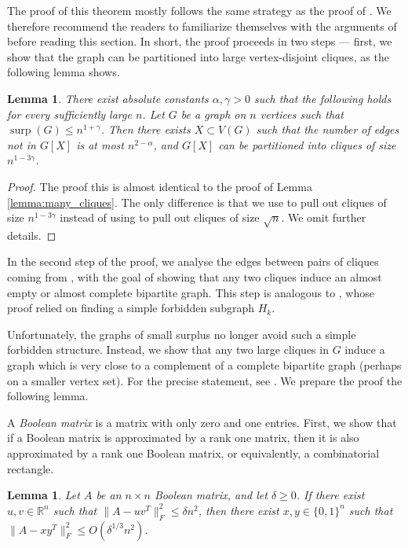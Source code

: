 \documentclass[11pt]{article}
\theoremstyle{plain}
\newtheorem{lemma}[theorem]{Lemma}
\theoremstyle{definition}
\DeclareMathOperator{\surp}{surp}
\begin{document}
The proof of this theorem mostly follows the same strategy as the proof of . We therefore recommend the readers to familiarize themselves with the arguments of  before reading this section. 
In short, the proof proceeds in two steps --- first, we show that the graph can be partitioned into large vertex-disjoint cliques, as the following lemma shows.

\begin{lemma}\label{lemma:many_cliques_MaxCut}
    There exist absolute constants $\alpha, \gamma>0$ such that the following holds for every sufficiently large $n$. 
    Let $G$ be a graph on $n$ vertices such that $\surp(G)\leq n^{1+\gamma}$. Then there exists $X\subset V(G)$ such that the number of edges not in $G[X]$ is at most $n^{2-\alpha}$, and $G[X]$ can be partitioned into cliques of size $n^{1-3\gamma}$. 
\end{lemma}

\begin{proof}
    The proof this is almost identical to the proof of Lemma \ref{lemma:many_cliques}. 
    The only difference is that we use  to pull out cliques of size $n^{1-3\gamma}$ instead of using  to pull out cliques of size $\sqrt{n}$. 
    We omit further details.
\end{proof}

In the second step of the proof, we analyse the edges between pairs of cliques coming from , with the goal of showing that any two cliques induce an almost empty or almost complete bipartite graph. 
This step is analogous to , whose proof relied on finding a simple forbidden subgraph $H_k$. 

Unfortunately, the graphs of small surplus no longer avoid such a simple forbidden structure. Instead, we show that any two large cliques in $G$ induce a graph which is very close to a complement of a complete bipartite graph (perhaps on a smaller vertex set). For the precise statement, see . 
We prepare the proof the following lemma.

A \emph{Boolean matrix} is a matrix with only zero and one entries. First, we show that if a Boolean matrix is approximated by a rank one matrix, then it is also approximated by a rank one Boolean matrix, or equivalently, a combinatorial rectangle.

\begin{lemma}\label{lemma:rank1_approximation}
Let $A$ be an $n\times n$ Boolean matrix, and let $\delta\geq 0$. If there exist $u,v\in \mathbb{R}^n$ such that $\|A-uv^T\|_F^2\leq \delta n^2$, then there exist $x,y\in \{0,1\}^n$  such that $\|A-xy^T\|_F^2\leq O(\delta^{1/3}n^2)$.
\end{lemma}
\end{document}
